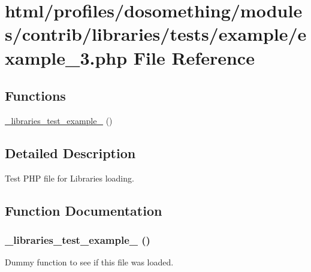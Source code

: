 \hypertarget{example__3_8php}{
\section{html/profiles/dosomething/modules/contrib/libraries/tests/example/example\_\-3.php File Reference}
\label{example__3_8php}
}
\subsection*{Functions}
\begin{DoxyCompactItemize}
\item 
\hyperlink{example__3_8php_a8215a30646891dec666d606dd0760259}{\_\-libraries\_\-test\_\-example\_} ()
\end{DoxyCompactItemize}


\subsection{Detailed Description}
Test PHP file for Libraries loading. 

\subsection{Function Documentation}
\hypertarget{example__3_8php_a8215a30646891dec666d606dd0760259}{
\subsubsection[{\_\-libraries\_\-test\_\-example\_\-3}]{\setlength{\rightskip}{0pt plus 5cm}\_\-libraries\_\-test\_\-example\_ ()}}
\label{example__3_8php_a8215a30646891dec666d606dd0760259}
Dummy function to see if this file was loaded. 